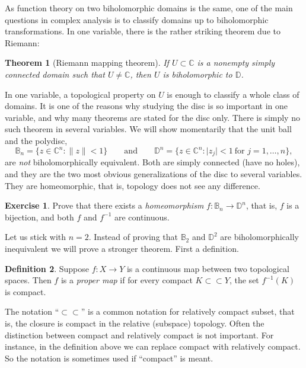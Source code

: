 \documentclass[12pt,openany]{book}
\newcommand{\sabs}[1]{\lvert {#1} \rvert}
\newcommand{\snorm}[1]{\lVert {#1} \rVert}
\newcommand{\C}{{\mathbb{C}}}
\newcommand{\D}{{\mathbb{D}}}
\newcommand{\bB}{{\mathbb{B}}}
\newcommand{\myindex}[1]{#1\index{#1}}
\theoremstyle{plain}
\newtheorem{thm}{Theorem}[section]
\theoremstyle{remark}
\theoremstyle{definition}
\newtheorem{defn}[thm]{Definition}
\newenvironment{exbox}{%
    \def\FrameCommand{\vrule width 1pt \relax\hspace{10pt}}%
    \MakeFramed{\advance\hsize-\width\FrameRestore}%
}{%
    \endMakeFramed
}
\theoremstyle{exercise}
\newtheorem{exercise}{Exercise}[section]
\theoremstyle{example}
\begin{document}
As function theory on two biholomorphic domains is the same,
one of the main questions in complex analysis is to classify domains up
to biholomorphic transformations.  In one variable, there is the rather
striking theorem due to Riemann:

\begin{thm}[Riemann mapping theorem]
If $U \subset \C$ is a nonempty simply connected domain such that $U \neq \C$,
then $U$ is biholomorphic to $\D$.
\end{thm}

In one variable, a topological property on $U$ is enough to classify a whole
class of domains.  It is one of the reasons why studying the disc is so
important in one variable, and why many theorems are stated for
the disc only.
There is simply no such theorem in several variables.
We will show momentarily that the unit ball and the polydisc,
\begin{equation*}
\bB_n = \bigl\{ z \in \C^n : \snorm{z} < 1 \bigr\}
\qquad \text{and} \qquad
\D^n = \bigl\{ z \in \C^n : \sabs{z_j} < 1 ~\text{for $j=1,\ldots,n$} \bigr\} ,
\end{equation*}
are \emph{not} biholomorphically equivalent.  Both are simply
connected (have no holes), and they are the two most obvious generalizations
of the disc to several variables.  They are homeomorphic, that is, topology
does not see any difference.

\begin{exbox}
\begin{exercise}
Prove that there exists a \emph{\myindex{homeomorphism}} $f \colon \bB_n \to
\D^n$,
that is, $f$ is a bijection, and both $f$ and $f^{-1}$ are continuous.
\end{exercise}
\end{exbox}


Let us stick with $n=2$.
Instead of proving that $\bB_2$ and
$\D^2$ are biholomorphically 
inequivalent we will prove a stronger theorem.  First a
definition.

\begin{defn}
Suppose $f \colon X \to Y$ is a continuous map between two topological
spaces.  Then $f$ is a \emph{\myindex{proper map}} if for every compact
%
%
$K \subset \subset Y$, the set $f^{-1}(K)$ is compact.
\end{defn}

The notation ``$\subset \subset$'' is a common notation for relatively
compact subset, that is, the closure is compact in the relative (subspace)
topology.  Often the distinction between compact and relatively
compact is not important.  For instance, in the definition above we can replace
compact with relatively compact.
So the notation is sometimes used if ``compact'' is meant.
\end{document}
